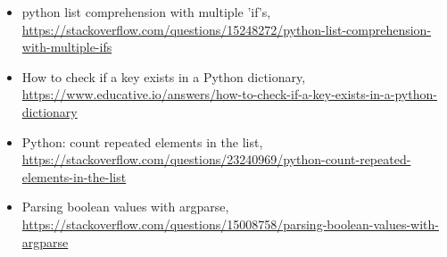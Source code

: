 \documentclass[12pt]{article}
\begin{document}
\begin{itemize}
    \item {python list comprehension with multiple 'if's, \url{https://stackoverflow.com/questions/15248272/python-list-comprehension-with-multiple-ifs}}
    \item {How to check if a key exists in a Python dictionary, \url{https://www.educative.io/answers/how-to-check-if-a-key-exists-in-a-python-dictionary}}
    \item {Python: count repeated elements in the list, \url{https://stackoverflow.com/questions/23240969/python-count-repeated-elements-in-the-list}}
    \item {Parsing boolean values with argparse, \url{https://stackoverflow.com/questions/15008758/parsing-boolean-values-with-argparse}}

\end{itemize}
\end{document}
